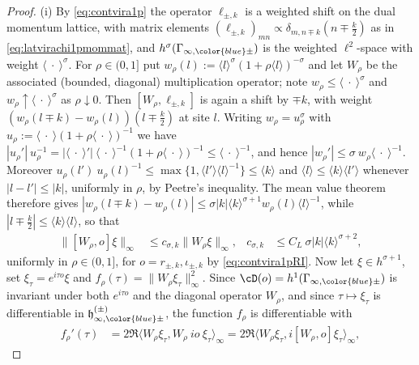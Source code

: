 \documentclass[a4paper, 11pt]{article}
\newcommand{\fh}{\mathfrak{h}}
\DeclareMathOperator{\1}{\mathds{1}}
\begin{document}
\begin{proof}
(i) By \eqref{eq:contvira1p} the operator $\ell_{\pm,k}$ is a weighted shift on the dual momentum lattice, with matrix elements $(\ell_{\pm,k})_{mn}\propto\delta_{m,n\mp k}(n\mp\tfrac{k}{2})$ as in \eqref{eq:latvirachi1pmommat}, and $h^{\sigma}(\Gamma_{\infty,{\color{blue}\pm}})$ is the weighted $\ell^{2}$-space with weight $\langle\!\ \cdot\!\ \rangle^{\sigma}$. For $\rho\in(0,1]$ put $w_{\rho}(l) := \langle l\rangle^{\sigma}(1+\rho\langle l\rangle)^{-\sigma}$ and let $W_{\rho}$ be the associated (bounded, diagonal) multiplication operator; note $w_{\rho}\leq\langle\!\ \cdot\!\ \rangle^{\sigma}$ and $w_{\rho}\uparrow\langle\!\ \cdot\!\ \rangle^{\sigma}$ as $\rho\downarrow0$. Then $[W_{\rho},\ell_{\pm,k}]$ is again a shift by $\mp k$, with weight $(w_{\rho}(l\mp k)-w_{\rho}(l))(l\mp\tfrac{k}{2})$ at site $l$. Writing $w_{\rho} = u_{\rho}^{\sigma}$ with $u_{\rho} := \langle\!\ \cdot\!\ \rangle(1+\rho\langle\!\ \cdot\!\ \rangle)^{-1}$ we have $|u_{\rho}'|\!\ u_{\rho}^{-1} = |\langle\!\ \cdot\!\ \rangle'|\!\ \langle\!\ \cdot\!\ \rangle^{-1}(1+\rho\langle\!\ \cdot\!\ \rangle)^{-1}\leq\langle\!\ \cdot\!\ \rangle^{-1}$, and hence $|w_{\rho}'|\leq\sigma\!\ w_{\rho}\langle\!\ \cdot\!\ \rangle^{-1}$. Moreover $u_{\rho}(l')\!\ u_{\rho}(l)^{-1}\leq\max\{1,\langle l'\rangle\langle l\rangle^{-1}\}\leq\langle k\rangle$ and $\langle l\rangle\leq\langle k\rangle\langle l'\rangle$ whenever $|l-l'|\leq|k|$, uniformly in $\rho$, by Peetre's inequality. The mean value theorem therefore gives $|w_{\rho}(l\mp k)-w_{\rho}(l)|\leq\sigma|k|\langle k\rangle^{\sigma+1}w_{\rho}(l)\langle l\rangle^{-1}$, while $|l\mp\tfrac{k}{2}|\leq\langle k\rangle\langle l\rangle$, so that
\begin{align}
\label{eq:sobolevcomm1p}
\|[W_{\rho},o]\xi\|_{\infty} & \leq c_{\sigma,k}\|W_{\rho}\xi\|_{\infty}, & c_{\sigma,k} & \leq C_{L}\!\ \sigma|k|\langle k\rangle^{\sigma+2},
\end{align}
uniformly in $\rho\in(0,1]$, for $o = r_{\pm,k},\iota_{\pm,k}$ by \eqref{eq:contvira1pRI}. Now let $\xi\in h^{\sigma+1}$, set $\xi_{\tau} = e^{i\tau o}\xi$ and $f_{\rho}(\tau) = \|W_{\rho}\xi_{\tau}\|_{\infty}^{2}$. Since $\cD(o) = h^{1}(\Gamma_{\infty,{\color{blue}\pm}})$ is invariant under both $e^{i\tau o}$ and the diagonal operator $W_{\rho}$, and since $\tau\mapsto\xi_{\tau}$ is differentiable in $\fh^{(\pm)}_{\infty,{\color{blue}\pm}}$, the function $f_{\rho}$ is differentiable with
\begin{align*}
f_{\rho}'(\tau) & = 2\Re\langle W_{\rho}\xi_{\tau},W_{\rho}\!\ io\!\ \xi_{\tau}\rangle_{\infty} = 2\Re\langle W_{\rho}\xi_{\tau},i[W_{\rho},o]\xi_{\tau}\rangle_{\infty},

\end{align*}
\end{proof}
\end{document}
